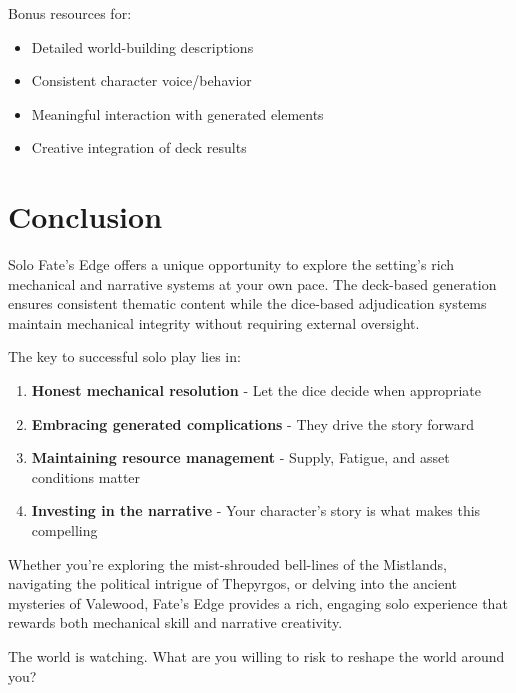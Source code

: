 \documentclass[11pt]{article}
\begin{document}
Bonus resources for:
\begin{itemize}
    \item Detailed world-building descriptions
    \item Consistent character voice/behavior
    \item Meaningful interaction with generated elements
    \item Creative integration of deck results
\end{itemize}

\section{Conclusion}

Solo Fate's Edge offers a unique opportunity to explore the setting's rich mechanical and narrative systems at your own pace. The deck-based generation ensures consistent thematic content while the dice-based adjudication systems maintain mechanical integrity without requiring external oversight.

The key to successful solo play lies in:
\begin{enumerate}
    \item \textbf{Honest mechanical resolution} - Let the dice decide when appropriate
    \item \textbf{Embracing generated complications} - They drive the story forward
    \item \textbf{Maintaining resource management} - Supply, Fatigue, and asset conditions matter
    \item \textbf{Investing in the narrative} - Your character's story is what makes this compelling
\end{enumerate}

Whether you're exploring the mist-shrouded bell-lines of the Mistlands, navigating the political intrigue of Thepyrgos, or delving into the ancient mysteries of Valewood, Fate's Edge provides a rich, engaging solo experience that rewards both mechanical skill and narrative creativity.

The world is watching. What are you willing to risk to reshape the world around you?
\end{document}
